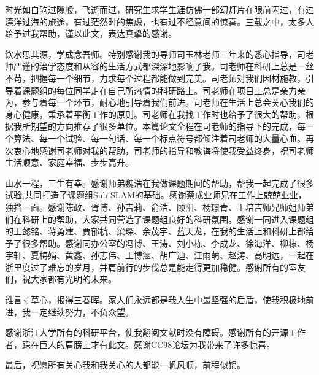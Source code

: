 \cleardoublepage
{}


时光如白驹过隙般，飞逝而过，研究生求学生涯仿佛一部幻灯片在眼前闪过，有过漂洋过海的旅途，有过茫然时的焦虑，也有过不经意间的惊喜。三载之中，太多人给予过我帮助，谨以此文，表达真挚的感谢。

饮水思其源，学成念吾师。特别感谢我的导师司玉林老师三年来的悉心指导，司老师严谨的治学态度和从容的生活方式都深深地影响了我。司老师在科研上总是一丝不苟，把握每一个细节，力求每个过程都能做到完美。司老师对我们因材施教，引导着课题组的每位同学走在自己所热情的科研路上。司老师在项目上总是亲力亲为，参与着每一个环节，耐心地引导着我们前进。司老师在生活上总会关心我们的身心健康，秉承着平衡工作的原则。司老师在我找工作时也给予了很大的帮助，根据我所期望的方向推荐了很多单位。本篇论文全程在司老师的指导下的完成，每一个算法、每一个试验、每一句话、每一个标点符号都倾注着司老师的大量心血。再次衷心地感谢司老师对我的帮助，司老师的指导和教诲将使我受益终身，祝司老师生活顺意、家庭幸福、步步高升。

山水一程，三生有幸。感谢师弟魏浩在我做课题期间的帮助，帮我一起完成了很多试验,共同打造了课题组Sub-SLAM的基础。感谢蔡成业师兄在工作上兢兢业业，独挡一面。感谢陈政、胥博、孙吉莉、俞浩、顾阳、杨璟青、王培吉师兄师姐师弟们在科研上的帮助，大家共同营造了课题组良好的科研氛围。感谢一同进入课题组的王懿铭、蒋勇建、贾郁杭、梁琛、余茂宇、蓝天龙，在我的生活上和科研上都给予了很多帮助。感谢同办公室的冯博、王涛、刘小栋、李成龙、徐海洋、柳棣、杨宇轩、夏梅娟、黄鑫、孙志伟、王博涵、胡广迪、江雨萌、赵涛、高明远，一起在浙里度过了难忘的岁月，并肩前行的步伐总是能走得更加稳健。感谢所有的室友们，祝大家都有光明的未来。

谁言寸草心，报得三春晖。家人们永远都是我人生中最坚强的后盾，使我积极地前进，我一定继续努力，不负众望。

感谢浙江大学所有的科研平台，使我翻阅文献时没有障碍。感谢所有的开源工作者，踩在巨人的肩膀上才有此文。感谢CC98论坛为我带来了许多惊喜。

最后，祝愿所有关心我和我关心的人都能一帆风顺，前程似锦。






